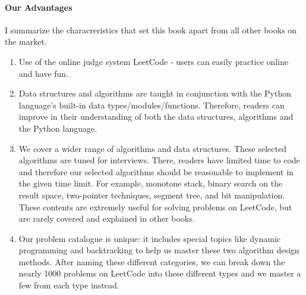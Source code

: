 \documentclass[12pt]{article}
\begin{document}
\paragraph{Our Advantages}  I summarize the characreristics that set this book apart from all other books on the market.
\begin{enumerate}
    \item Use of the online judge system LeetCode - users can easily practice online and have fun.
    \item Data structures and algorithms are taught in conjunction with the Python language's built-in data types/modules/functions. Therefore, readers can improve in their understanding of both the data structures, algorithms and the Python language.
    \item We cover a wider range of algorithms and data structures. These selected algorithms are tuned for interviews. There, readers have limited time to code and therefore our selected algorithms should be reasonable to implement in the given time limit. For example, monotone stack, binary search on the result space, two-pointer techniques, segment tree, and bit manipulation. These contents are extremely useful for solving problems on LeetCode, but are rarely covered and explained in other books.
    \item Our problem catalogue is unique: it includes special topics like dynamic programming and backtracking to help us master these two algorithm design methods. After naming these different categories, we can break down the nearly 1000 problems on LeetCode into these different types and we master a few from each type instead. 
\end{enumerate}


\end{document}
